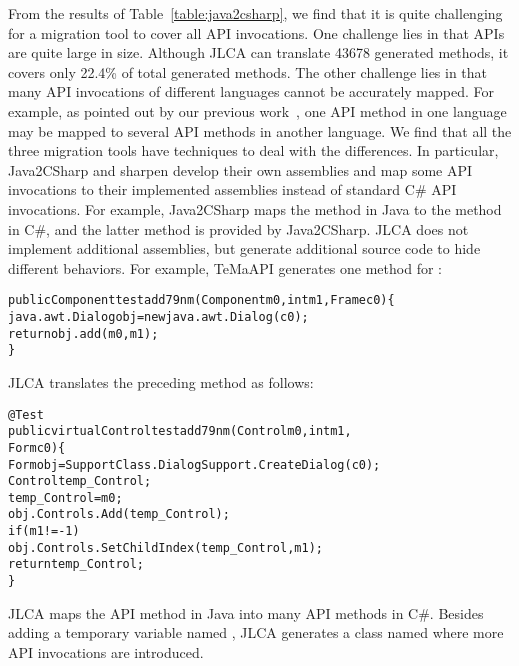 From the results of Table~\ref{table:java2csharp}, we find that it is quite challenging for a migration tool to cover all API invocations. One challenge lies in that APIs are quite large in size. Although JLCA can translate 43678 generated methods, it covers only 22.4\% of total generated methods. The other challenge lies in that many API invocations of different languages cannot be accurately mapped. For example, as pointed out by our previous work~\cite{zhong2010mining}, one API method in one language may be mapped to several API methods in another language. We find that all the three migration tools have techniques to deal with the differences. In particular, Java2CSharp and sharpen develop their own assemblies and map some API invocations to their implemented assemblies instead of standard C\# API invocations. For example, Java2CSharp maps the  method in Java to the  method in C\#, and the latter method is provided by Java2CSharp. JLCA does not implement additional assemblies, but generate additional source code to hide different behaviors. For example, TeMaAPI generates one method for  :

\begin{CodeOut}%
\begin{alltt}
public Component testadd79nm(Component m0,int m1,Frame c0)\{
  java.awt.Dialog obj = new java.awt.Dialog(c0);
  return obj.add(m0,m1);
\}
\end{alltt}
\end{CodeOut}

JLCA translates the preceding method as follows:

\begin{CodeOut}%
\begin{alltt}
@Test
public virtual Control testadd79nm(Control m0, int m1,
                                              Form c0)\{
  Form obj = SupportClass.DialogSupport.CreateDialog(c0);
  Control temp_Control;
  temp_Control = m0;
  obj.Controls.Add(temp_Control);
  if (m1 != -1)
    obj.Controls.SetChildIndex(temp_Control, m1);
  return temp_Control;
\}
\end{alltt}
\end{CodeOut}

JLCA maps the API method in Java into many API methods in C\#. Besides adding a temporary variable named , JLCA generates a class named  where more API invocations are introduced.

